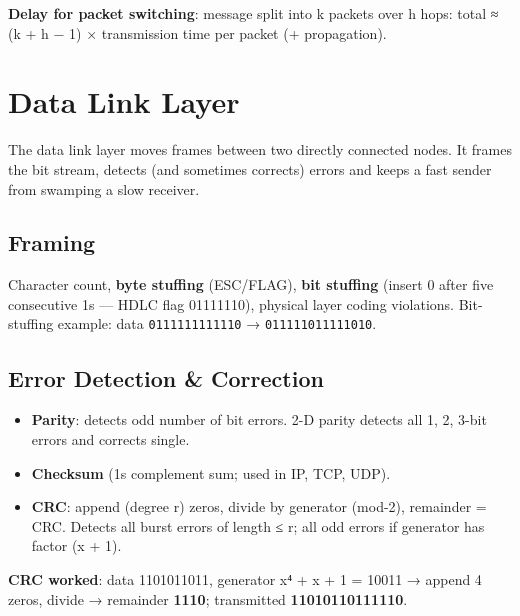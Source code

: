 \endgroup

\textbf{Delay for packet switching}: message split into k packets over h hops: total ≈ (k + h − 1) × transmission time per packet (+ propagation).

\needspace{227pt}

\hypertarget{p2-09--6-data-link-layer}{%
\section{Data Link Layer}\label{p2-09--6-data-link-layer}}

The data link layer moves frames between two directly connected nodes. It frames the bit stream, detects (and
sometimes corrects) errors and keeps a fast sender from swamping a slow receiver.

\needspace{161pt}

\hypertarget{p2-09--61-framing}{%
\subsection{Framing}\label{p2-09--61-framing}}

Character count, \textbf{byte stuffing} (ESC/FLAG), \textbf{bit stuffing} (insert 0 after five consecutive 1s --- HDLC flag 01111110), physical layer coding violations.
Bit-stuffing example: data \texttt{0111111111110} → \texttt{011111011111010}.

\needspace{95pt}

\hypertarget{p2-09--62-error-detection--correction}{%
\subsection{Error Detection \& Correction}\label{p2-09--62-error-detection--correction}}

\begin{itemize}
\tightlist
\item
  \textbf{Parity}: detects odd number of bit errors. 2-D parity detects all 1, 2, 3-bit errors and corrects single.
\item
  \textbf{Checksum} (1\textquotesingle s complement sum; used in IP, TCP, UDP).
\item
  \textbf{CRC}: append (degree r) zeros, divide by generator (mod-2), remainder = CRC. Detects all burst errors of length ≤ r; all odd errors if generator has factor (x + 1).
\end{itemize}

\textbf{CRC worked}: data 1101011011, generator x⁴ + x + 1 = 10011 → append 4 zeros, divide → remainder \textbf{1110}; transmitted \textbf{11010110111110}.

